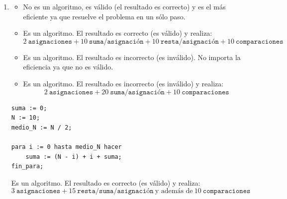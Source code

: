 \documentclass[a4paper,10pt]{article}
\begin{document}
\begin{enumerate}
\begin{small}
\begin{verbatim}
escribir("Ingrese la Cantidad de Comensales");
leer(cant);
escribir("Ingrese el precio de arroz (por kilo)");
leer(precio_arroz);
escribir("Ingrese el precio de los langostinos (por kilo)");
leer(precio_langostinos);

cant := cant / 4;
arroz := cant * 0.5 * precio_arroz;
langostinos := cant * 0.25 * precio_langostinos;

escribir("Cantidad necesaria de arroz");
escribir(cant * 0.5);
escribir("Cantidad necesaria de langostinos");
escribir(cant * 0.25);
escribir("Costo del arroz");
escribir(arroz);
escribir("Costo de los langostinos");
escribir(langostinos);
\end{verbatim}
            \end{small}
\item[12]
    \begin{itemize}
        \item[a-]
            No es un algoritmo, es v\'alido (el resultado es correcto) y es el m\'as eficiente ya que resuelve el problema en un s\'olo paso.
        \item[b-]
            Es un algoritmo. El resultado es correcto (es v\'alido) y realiza: 
            \[ 2 ~\texttt{asignaciones} + 10 ~\texttt{suma/asignaci\'on} + 10 ~\texttt{resta/asignaci\'on} + 10 ~\texttt{comparaciones}\]
        \item[c-]
            Es un algoritmo. El resultado es incorrecto (es inv\'alido). No importa la eficiencia ya que no es v\'alido.
        \item[d-]
            Es un algoritmo. El resultado es incorrecto (es inv\'alido) y realiza:
            \[ 2 ~\texttt{asignaciones} + 20 ~\texttt{suma/asignaci\'on} + 10 ~\texttt{comparaciones}\]
    \end{itemize}
    
            \begin{small}
\begin{verbatim}
suma := 0;
N := 10;
medio_N := N / 2;

para i := 0 hasta medio_N hacer
    suma := (N - i) + i + suma;
fin_para;

\end{verbatim}
            \end{small}
        Es un algoritmo. El resultado es correcto (es v\'alido) y realiza:
            \[ 3 ~\texttt{asignaciones} + 15 ~\texttt{resta/suma/asignaci\'on} ~\textrm{y adem\'as de} ~10 ~\texttt{comparaciones}\]
\end{enumerate}
\end{document}
